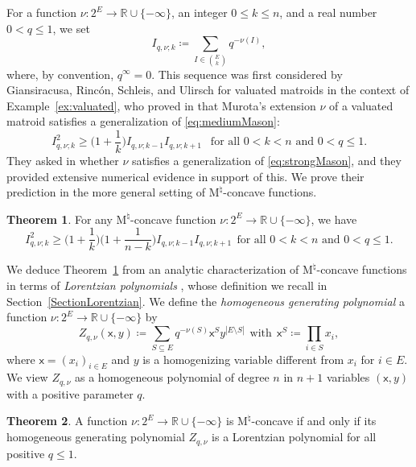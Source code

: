 \documentclass{amsart}
\theoremstyle{definition}
\newtheorem{theorem}{Theorem}[section]
\theoremstyle{remark}
\newcommand{\abs}[1]{\left|#1\right|}               %
\newcommand{\x}{\mathsf{x}}    %
\newcommand{\1}{\mathbf{1}}
\newcommand{\Mnat}{$\text{M}^\natural$}
\numberwithin{equation}{section}
\begin{document}
For a function $\nu:2^{E} \to \mathbb{R} \cup \{-\infty\}$, an integer $0 \le k \le n$, and a  real number $0<q\leq 1$, we set
\[
I_{q,\nu;k}\coloneqq \sum_{I\in \binom{E}{k}} q^{-\nu(I)}, 
  \]
where, by convention, $q^\infty=0$. This sequence was first considered by Giansiracusa, Rincón, Schleis, and Ulirsch for valuated matroids in the context of Example~\ref{ex:valuated}, who proved in \cite[Theorem A]{GRSU24} that Murota's extension $\nu$ of a valuated matroid  satisfies 
a generalization of \eqref{eq:mediumMason}:
\[
  I_{q,\nu;k}^2 \geq \Big(1+\frac1k\Big)I_{q,\nu;k-1}  I_{q,\nu;k+1} \ \  \text{ for all $0<k<n$ and $0 < q \leq 1$}.
\]
They asked in \cite[Question 4.1]{GRSU24} whether $\nu$ satisfies a generalization of \eqref{eq:strongMason}, and they provided extensive numerical evidence in support of this.
We prove their prediction in the more general setting of \Mnat-concave functions.

\begin{theorem}\label{thm:valuated}
For any \Mnat-concave function $\nu\colon 2^{E} \to \mathbb{R} \cup \{-\infty\}$,  we have
\[
I_{q,\nu;k}^2 \geq \Big(1+\frac1k\Big)\Big(1+\frac1{n-k}\Big) I_{q,\nu;k-1}
    I_{q,\nu;k+1} \ \ \text{for  all $0<k<n$ and $0<q\leq 1$.}
\]
\end{theorem}

We deduce Theorem~\ref{thm:valuated} from an analytic characterization of 
 \Mnat-concave functions in terms of  \emph{Lorentzian polynomials} \cite{BH20}, whose definition we recall in Section~\ref{SectionLorentzian}.
We define the \emph{homogeneous generating polynomial}  a function $\nu\colon 2^{E} \to \mathbb{R} \cup \{-\infty\}$ by
\[
 Z_{q,\nu}(\x,y) \coloneqq \sum_{S\subseteq E}q^{-\nu(S)}\x^S y^{\abs{E \setminus S}} \ \ \text{with} \ \    \x^S \coloneqq \prod_{i \in S} x_i,
\]
where $\x=(x_i)_{i \in E}$ and $y$ is a  homogenizing variable different from $x_i$ for $i \in E$. We view $Z_{q,\nu}$ as a homogeneous polynomial of degree $n$ in $n+1$ variables $(\x,y)$ with a positive parameter $q$.

\begin{theorem}\label{thm:qLorentzian}
A function $\nu: 2^{E} \to \mathbb{R} \cup \{-\infty\}$ is \Mnat-concave if and only if its homogeneous generating polynomial
$Z_{q,\nu}$ is a Lorentzian polynomial for all positive $q \le 1$.
\end{theorem}
\end{document}
